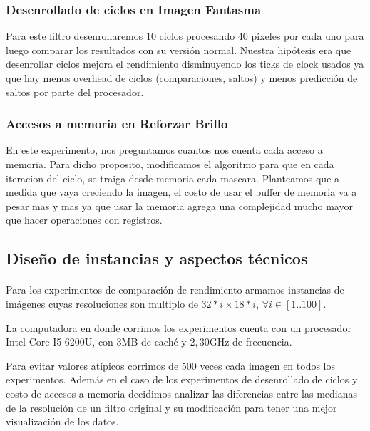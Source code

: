 \documentclass[a4paper]{article}
\begin{document}
\subsubsection{Desenrollado de ciclos en Imagen Fantasma}

Para este filtro desenrollaremos 10 ciclos procesando 40 pixeles por cada uno para luego comparar los resultados con su versi\'on normal. Nuestra hipótesis era que desenrollar ciclos mejora el rendimiento disminuyendo los ticks de clock usados ya que hay menos overhead de ciclos (comparaciones, saltos) y menos predicci\'on de saltos por parte del procesador.

\subsubsection{Accesos a memoria en Reforzar Brillo}

En este experimento, nos preguntamos cuantos nos cuenta cada acceso a memoria. Para dicho proposito, modificamos el algoritmo para que en cada iteracion del ciclo, se traiga desde memoria cada mascara. Planteamos que a medida que vaya creciendo la imagen, el costo de usar el buffer de memoria va a pesar mas y mas ya que usar la memoria agrega una complejidad mucho mayor que hacer operaciones con registros. 

\subsection{Dise\~no de instancias y aspectos t\'ecnicos}


\paragraph{} Para los experimentos de comparaci\'on de rendimiento armamos instancias de imágenes cuyas resoluciones son multiplo de $32*i \times 18*i$, $\forall i \in [1..100]$.


La computadora en donde corrimos los experimentos cuenta con un procesador Intel Core I5-6200U, con 3MB de cach\'e y $2,30$GHz de frecuencia.


Para evitar valores at\'ipicos corrimos de 500 veces cada imagen en todos los experimentos. Adem\'as en el caso de los experimentos de desenrollado de ciclos y costo de accesos a memoria decidimos analizar las diferencias entre las medianas de la resoluci\'on de un filtro original y su modificaci\'on para tener una mejor visualizaci\'on de los datos.

\newpage
\end{document}
